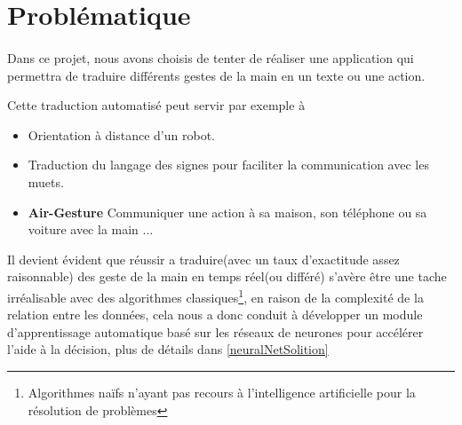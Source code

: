 \section{Problématique}
\paragraph{}
Dans ce projet, nous avons choisis de tenter de réaliser une application qui permettra de traduire différents gestes de la main en un texte ou une action.\par
Cette traduction automatisé peut servir par exemple à 
\begin{itemize}[label=\textbullet]
	\item Orientation à distance d'un robot.
	\item Traduction du langage des signes pour faciliter la communication avec les muets.
	\item \textbf{Air-Gesture} Communiquer une action à sa maison, son téléphone ou sa voiture avec la main ...
\end{itemize}\par 
Il devient évident que réussir a traduire(avec un taux d'exactitude assez raisonnable) des geste de la main en temps réel(ou différé) s'avère être une tache irréalisable avec des algorithmes classiques\footnote{Algorithmes naïfs n'ayant pas recours à l'intelligence artificielle pour la résolution de problèmes}, en raison de la complexité de la relation entre les données, cela nous a donc conduit à développer un module d'apprentissage automatique basé sur les réseaux de neurones \label{ProlemSolver}
 pour accélérer l'aide à la décision, plus de détails dans \ref{neuralNetSolition}